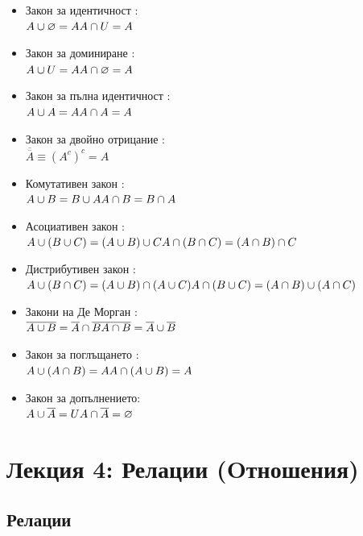 \documentclass[fleqn, 12pt]{article}
\theoremstyle{definition}
\begin{document}
\begin{itemize}
	\item Закон за идентичност : \\
$A \cup \varnothing = A \\
 A \cap U = A$
	\item Закон за доминиране :  \\
$A \cup U = A \\
 A \cap \varnothing = A$
	\item Закон за пълна идентичност : \\
$A \cup A = A \\
 A \cap A = A$
	\item Закон за двойно отрицание : \\
$\overline{\overline{A}} \equiv (A^c)^c  = A$
	\item Комутативен закон :\\ 
$A \cup B = B \cup A \\ 
A \cap B = B \cap A $
	\item Асоциативен закон :\\ 
$A \cup (B \cup C) = (A \cup B) \cup C \\ 
A \cap (B \cap C) = (A \cap B) \cap C $
	\item Дистрибутивен закон : \\
$A \cup (B \cap C) = (A \cup B) \cap (A \cup C) \\
 A \cap (B \cup C) = (A \cap B) \cup (A \cap C) $
	\item Закони на Де Морган : \\
$\overline{A \cup B} = \overline{A} \cap \overline{B} \\
\overline{A \cap B} = \overline{A} \cup \overline{B}$
	\item Закон за поглъщането : \\
$A \cup (A \cap B) = A \\
 A \cap (A \cup B) = A $
	\item Закон за допълнението: \\
$A \cup \overline{A} = U \\
 A \cap \overline{A} = \varnothing $  
\end{itemize}

\newpage 

\section{Лекция 4: Релации (Oтношения)}

\subsection{Релации}
\end{document}
